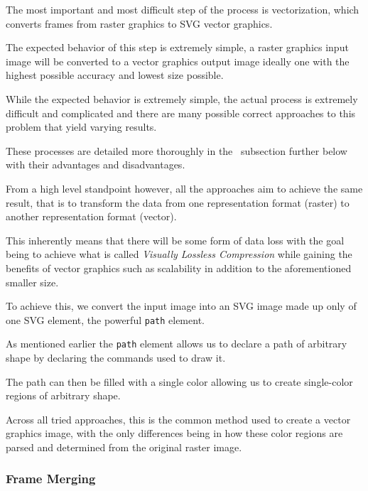 \documentclass[12pt]{article}
\newcommand{\sentence}{} %
\newcommand{\italic}[1]{\textit{#1}}
\begin{document}
    \tab
    The most important and most difficult step of the process is vectorization, which converts
    frames from raster graphics to SVG vector graphics.
    \sentence
    The expected behavior of this step is extremely simple, a raster graphics input image will be converted to a
    vector graphics output image ideally one with the highest possible accuracy and lowest size possible.
    \sentence
    While the expected behavior is extremely simple, the actual process is extremely difficult and complicated and
    there are many possible correct approaches to this problem that yield varying results.
    \sentence
    These processes are detailed more thoroughly in the~ subsection further below
    with their advantages and disadvantages.
    \sentence
    From a high level standpoint however, all the approaches aim to achieve the same result, that is to transform the
    data from one representation format (raster) to another representation format (vector).
    \sentence
    This inherently means that there will be some form of data loss with the goal being to achieve what is called
    \italic{Visually Lossless Compression} while gaining the benefits of vector graphics such as scalability in
    addition to the aforementioned smaller size.
    \sentence
    To achieve this, we convert the input image into an SVG image made up only of one SVG element, the powerful
    \verb|path| element.
    \sentence
    As mentioned earlier the \verb|path| element allows us to declare a path of arbitrary shape by declaring the
    commands used to draw it.
    \sentence
    The path can then be filled with a single color allowing us to create single-color regions of arbitrary shape.
    \sentence
    Across all tried approaches, this is the common method used to create a vector graphics image, with the only
    differences being in how these color regions are parsed and determined from the original raster image.


    \subsubsection{Frame Merging}\label{subsubsec:frame-merging}

\end{document}
